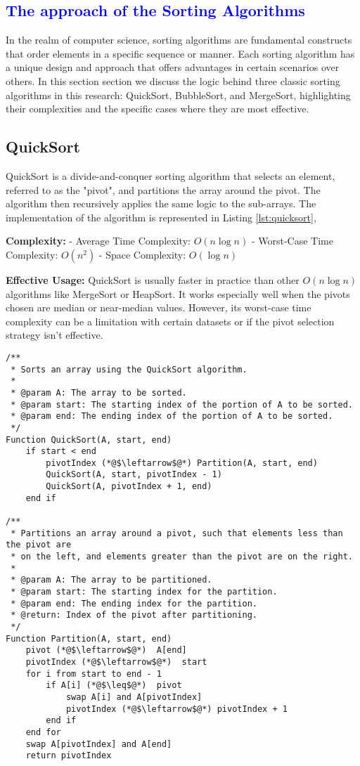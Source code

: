 \textcolor{blue}{\section{The approach of the Sorting Algorithms}}

In the realm of computer science, sorting algorithms are fundamental constructs that order elements in a specific sequence or manner. Each sorting algorithm has a unique design and approach that offers advantages in certain scenarios over others. In this section section we discuss the logic behind three classic sorting algorithms in this research: QuickSort, BubbleSort, and MergeSort, highlighting their complexities and the specific cases where they are most effective.

\subsection{QuickSort}
QuickSort is a divide-and-conquer sorting algorithm that selects an element, referred to as the "pivot", and partitions the array around the pivot. The algorithm then recursively applies the same logic to the sub-arrays. The implementation of the algorithm is represented in Listing \ref{lst:quicksort},

\textbf{Complexity:}
- Average Time Complexity: \(O(n \log n)\)
- Worst-Case Time Complexity: \(O(n^2)\)
- Space Complexity: \(O(\log n)\)

\textbf{Effective Usage:}
QuickSort is usually faster in practice than other \(O(n \log n)\) algorithms like MergeSort or HeapSort. It works especially well when the pivots chosen are median or near-median values. However, its worst-case time complexity can be a limitation with certain datasets or if the pivot selection strategy isn't effective.


\begin{lstlisting}[language=PseudoCode, label=lst:quicksort, caption=QuickSort and its Partition function]
/**
 * Sorts an array using the QuickSort algorithm.
 * 
 * @param A: The array to be sorted.
 * @param start: The starting index of the portion of A to be sorted.
 * @param end: The ending index of the portion of A to be sorted.
 */
Function QuickSort(A, start, end)
    if start < end
        pivotIndex (*@$\leftarrow$@*) Partition(A, start, end)
        QuickSort(A, start, pivotIndex - 1)
        QuickSort(A, pivotIndex + 1, end)
    end if

/**
 * Partitions an array around a pivot, such that elements less than the pivot are
 * on the left, and elements greater than the pivot are on the right.
 * 
 * @param A: The array to be partitioned.
 * @param start: The starting index for the partition.
 * @param end: The ending index for the partition.
 * @return: Index of the pivot after partitioning.
 */
Function Partition(A, start, end)
    pivot (*@$\leftarrow$@*)  A[end]
    pivotIndex (*@$\leftarrow$@*)  start
    for i from start to end - 1
        if A[i] (*@$\leq$@*)  pivot
            swap A[i] and A[pivotIndex]
            pivotIndex (*@$\leftarrow$@*) pivotIndex + 1
        end if
    end for
    swap A[pivotIndex] and A[end]
    return pivotIndex
\end{lstlisting}

